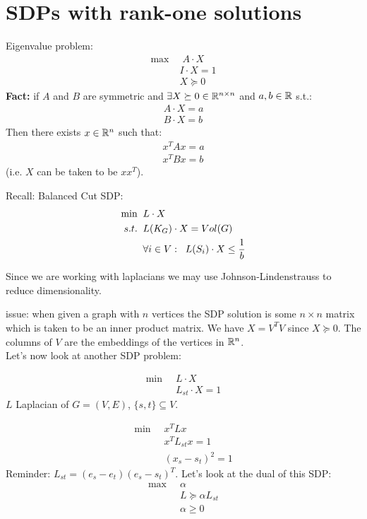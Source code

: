 \documentclass[11pt]{article}
\begin{document}

\section*{SDPs with rank-one solutions}
Eigenvalue problem:
\begin{align*}
    \max \; & \; A \cdot X\\
    & I \cdot X = 1 \\
    & X \succeq 0
\end{align*}
\textbf{Fact:} if $A$ and $B$ are symmetric and $\exists X \succeq 0\in \mathbb{R}^{n\times n}$ and $a,b \in \mathbb{R}$ s.t.:
\begin{align*}
    A \cdot X = a\\
    B \cdot X = b
\end{align*}
Then there exists $x \in \mathbb{R}^n$ such that:
\begin{align*}
    x^TAx = a\\
    x^TBx = b
\end{align*}
(i.e. $X$ can be taken to be $xx^T$).

Recall: Balanced Cut SDP:
\begin{align*}
    \min \;& \;L \cdot X\\
    s.t.  \;&\;L(K_G)\cdot X = Vol(G)\\
    & \;\forall i \in V: \hspace{2mm} L(S_i)\cdot X \leq \frac{1}{b}
\end{align*}

Since we are working with laplacians we may use Johnson-Lindenstrauss to reduce dimensionality.


issue: when given a graph with $n$ vertices the SDP solution is some $n \times n$ matrix which is taken to be an inner product matrix. We have $X = V^TV$ since $X \succeq 0$. The columns of $V$ are the embeddings of the vertices in $\mathbb{R}^n$.\\

Let's now look at another SDP problem:

\begin{align*}
    \min \;&\; L \cdot X\\
    &\; L_{st} \cdot X = 1
\end{align*}
$L$ Laplacian of $G = (V,E)$, $\{s,t\} \subseteq V$.

\begin{align*}
    \min \; &\; x^TLx\\
    & \; x^TL_{st}x =1\\
    &\; (x_s - s_t)^2 = 1
\end{align*}
Reminder: $L_{st} = (e_s - e_t)(e_s - s_t)^T$. Let's look at the dual of this SDP:
\begin{align*}
    \max \;&\; \alpha\\
    & \; L \succeq \alpha L_{st}\\
    & \; \alpha \geq 0
\end{align*}
\end{document}
